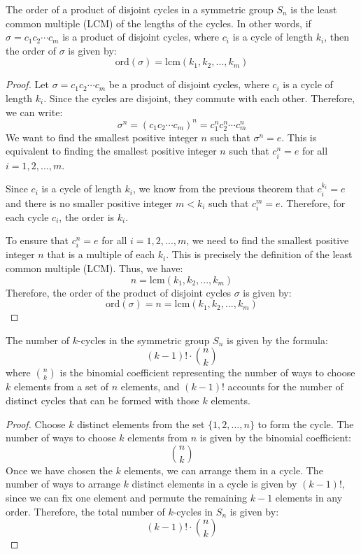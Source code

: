 \documentclass[openany]{book}
\begin{document}
\begin{mytheorem}
    The order of a product of disjoint cycles in a symmetric group \( S_n \) is the least common multiple (LCM) of the lengths of the cycles. In other words, if \( \sigma = c_1 c_2 \cdots c_m \) is a product of disjoint cycles, where \( c_i \) is a cycle of length \( k_i \), then the order of \( \sigma \) is given by:
    \[
    \text{ord}(\sigma) = \text{lcm}(k_1, k_2, \ldots, k_m)
    \]
\end{mytheorem}
\begin{proof}
    Let \( \sigma = c_1 c_2 \cdots c_m \) be a product of disjoint cycles, where \( c_i \) is a cycle of length \( k_i \). Since the cycles are disjoint, they commute with each other. Therefore, we can write:
    \[
    \sigma^n = (c_1 c_2 \cdots c_m)^n = c_1^n c_2^n \cdots c_m^n
    \]
    We want to find the smallest positive integer \( n \) such that \( \sigma^n = e \). This is equivalent to finding the smallest positive integer \( n \) such that \( c_i^n = e \) for all \( i = 1, 2, ..., m \).

    Since \( c_i \) is a cycle of length \( k_i \), we know from the previous theorem that \( c_i^{k_i} = e \) and there is no smaller positive integer \( m < k_i \) such that \( c_i^m = e \). Therefore, for each cycle \( c_i \), the order is \( k_i \).

    To ensure that \( c_i^n = e \) for all \( i = 1, 2, ..., m \), we need to find the smallest positive integer \( n \) that is a multiple of each \( k_i \). This is precisely the definition of the least common multiple (LCM). Thus, we have:
    \[
    n = \text{lcm}(k_1, k_2, ..., k_m)
    \]
    Therefore, the order of the product of disjoint cycles \( \sigma \) is given by:
    \[
    \text{ord}(\sigma) = n = \text{lcm}(k_1, k_2, ..., k_m)
    \]
\end{proof}
\begin{mytheorem}
    The number of $k$-cycles in the symmetric group \( S_n \) is given by the formula:
    \[(k-1)! \cdot \binom{n}{k}\]
    where \( \binom{n}{k} \) is the binomial coefficient representing the number of ways to choose \( k \) elements from a set of \( n \) elements, and \( (k-1)! \) accounts for the number of distinct cycles that can be formed with those \( k \) elements.
\end{mytheorem}
\begin{proof}
    Choose \( k \) distinct elements from the set \( \{1, 2, \ldots, n\} \) to form the cycle. The number of ways to choose \( k \) elements from \( n \) is given by the binomial coefficient:
    \[
    \binom{n}{k}
    \]
    Once we have chosen the \( k \) elements, we can arrange them in a cycle. The number of ways to arrange \( k \) distinct elements in a cycle is given by \( (k-1)! \), since we can fix one element and permute the remaining \( k-1 \) elements in any order. Therefore, the total number of \( k \)-cycles in \( S_n \) is given by:
    \[
    (k-1)! \cdot \binom{n}{k}
    \]
\end{proof}
\end{document}
